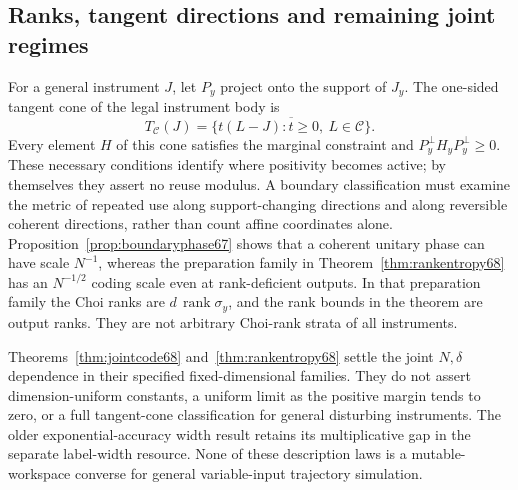 \subsection{Ranks, tangent directions and remaining joint regimes}
For a general instrument $J$, let $P_y$ project onto the support of
$J_y$. The one-sided tangent cone of the legal instrument body is
\[
 T_{\mathcal C}(J)=\overline{\{t(L-J):t\ge0,\ L\in\mathcal C\}}.
\]
Every element $H$ of this cone satisfies the marginal constraint and
$P_y^\perp H_yP_y^\perp\ge0$. These necessary conditions identify
where positivity becomes active; by themselves they assert no reuse
modulus. A boundary classification must examine the metric of
repeated use along support-changing directions and along reversible
coherent directions, rather than count affine coordinates alone.
Proposition~\ref{prop:boundaryphase67} shows that a coherent unitary
phase can have scale $N^{-1}$, whereas the preparation family in
Theorem~\ref{thm:rankentropy68} has an $N^{-1/2}$ coding scale even
at rank-deficient outputs. In that preparation family the Choi ranks
are $d\,\operatorname{rank}\sigma_y$, and the rank bounds in the
theorem are output ranks. They are not arbitrary Choi-rank strata of
all instruments.

Theorems~\ref{thm:jointcode68} and~\ref{thm:rankentropy68} settle the
joint $N,\delta$ dependence in their specified fixed-dimensional
families. They do not assert dimension-uniform constants, a uniform
limit as the positive margin tends to zero, or a full tangent-cone
classification for general disturbing instruments. The older
exponential-accuracy width result retains its multiplicative gap in
the separate label-width resource. None of these description laws
is a mutable-workspace converse for general variable-input
trajectory simulation.
